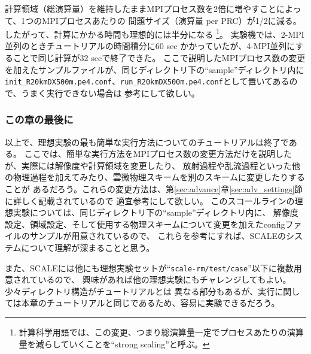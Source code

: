 計算領域（総演算量）を維持したままMPIプロセス数を2倍に増やすことによって、1つのMPIプロセスあたりの
問題サイズ（演算量 per PRC）が1/2に減る。したがって、計算にかかる時間も理想的には半分になる
\footnote{計算科学用語では、この変更、つまり総演算量一定でプロセスあたりの演算量を減らしていくことを``strong scaling''と呼ぶ。}。
実験機では、2-MPI並列のときチュートリアルの時間積分に60 sec かかっていたが、4-MPI並列にすることで同じ計算が32 secで終了できた。
ここで説明したMPIプロセス数の変更を加えたサンプルファイルが、同じディレクトリ下の``sample''ディレクトリ内に
\verb|init_R20kmDX500m.pe4.conf|、\verb|run_R20kmDX500m.pe4.conf|として置いてあるので、うまく実行できない場合は
参考にして欲しい。


\subsubsection{この章の最後に}

以上で、理想実験の最も簡単な実行方法についてのチュートリアルは終了である。
ここでは、簡単な実行方法をMPIプロセス数の変更方法だけを説明したが、実際には解像度や計算領域を変更したり、
放射過程や乱流過程といった他の物理過程を加えてみたり、雲微物理スキームを別のスキームに変更したりすることが
あるだろう。これらの変更方法は、第\ref{sec:advance}章\ref{sec:adv_settings}節に詳しく記載されているので
適宜参考にして欲しい。
このスコールラインの理想実験については、同じディレクトリ下の``sample''ディレクトリ内に、
解像度設定、領域設定、そして使用する物理スキームについて変更を加えたconfigファイルのサンプルが用意されているので、
これらを参考にすれば、SCALEのシステムについて理解が深まることと思う。

また、SCALEには他にも理想実験セットが``\verb|scale-rm/test/case|''以下に複数用意されているので、
興味があれば他の理想実験にもチャレンジしてもよい。少々ディレクトリ構造がチュートリアルとは
異なる部分もあるが、実行に関しては本章のチュートリアルと同じであるため、容易に実験できるだろう。




